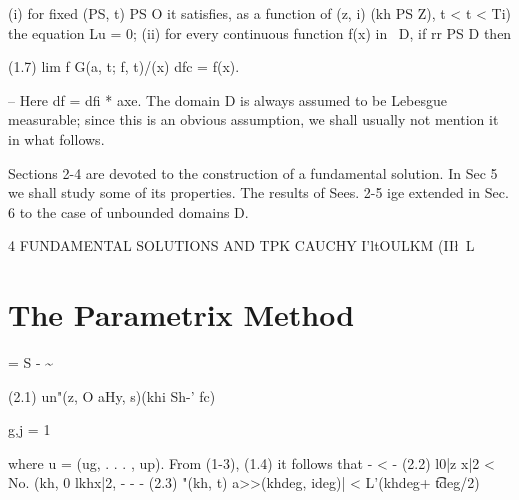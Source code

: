 \begin{ocrformula}
(i) for fixed (PS, t) PS O it satisfies, as a function    of (z, i) (kh PS Z),
t < t < Ti) the equation Lu = 0;
(ii) for every continuous function f(x) in ~D, if rr PS D then
\end{ocrformula}

\begin{ocrformula}
(1.7)                            lim       f G(a, t; f, t)/(x) dfc = f(x).
\end{ocrformula}

-- Here df = dfi * axe. The domain D is always assumed to be Lebesgue measurable; since this is an obvious assumption, we shall usually not mention it in what follows.

Sections 2-4 are devoted to the construction of a fundamental solution. In Sec 5 we shall study some of its properties. The results of Sees. 2-5 ige extended in Sec. 6 to the case of unbounded domains D.

\begin{ocrformula}
4                     FUNDAMENTAL           SOLUTIONS        AND    TPK          CAUCHY           I'ltOULKM           (II\l\ L
\end{ocrformula}

\section{The Parametrix Method}
\begin{ocrformula}
Let       (ai}(x, t)) be the inverse             matrix        to (atj(x, t)) and                   set
\end{ocrformula}

= S - \textasciitilde{}

\begin{ocrformula}
(2.1)                      un"(z, O                   aHy,       s)(khi               Sh-'               fc)
\end{ocrformula}

g,j = 1

\begin{ocrformula}
where        u =   (ug, . . . , up). From           (1-3), (1.4) it follows that
-                                  <             -
(2.2)                                 l0|z         x|2 < No. (kh,            0             lkh\kh            x|2,
-                                   -                            -
(2.3)                 \a"(kh, t)       a>>(khdeg, ideg)| < L'(\kh                    khdeg\a +           \t        tdeg\a/2)
\end{ocrformula}

